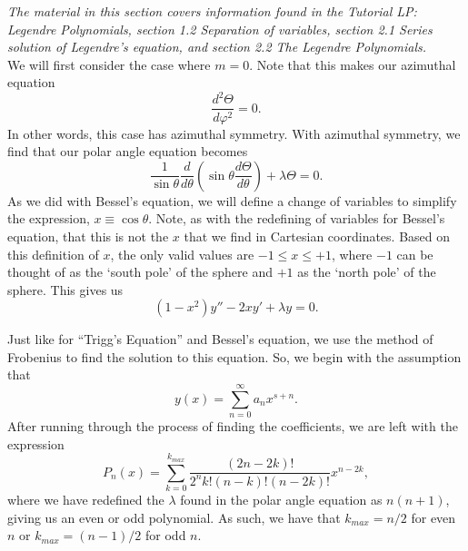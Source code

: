 \documentclass[11pt]{report}
\newcommand{\fpar}[1]{\left({#1}\right)}
\begin{document}
\emph{The material in this section covers information found in the Tutorial LP: Legendre Polynomials, section 1.2 Separation of variables, section 2.1 Series solution of Legendre’s equation, and section 2.2 The Legendre Polynomials.}\\



We will first consider the case where $m=0$. Note that this makes our azimuthal equation
    \begin{equation*}
        \frac{d^2\Theta}{d\varphi^2} = 0.
    \end{equation*}
In other words, this case has azimuthal symmetry. With azimuthal symmetry, we find that our polar angle equation becomes
    \begin{equation}
        \frac{1}{\sin{\theta}}\frac{d}{d\theta}\left(\sin{\theta}\frac{d\Theta}{d\theta}\right) + \lambda\Theta = 0.
    \end{equation}
As we did with Bessel's equation, we will define a change of variables to simplify the expression, $x\equiv\cos{\theta}$. Note, as with the redefining of variables for Bessel's equation, that this is not the $x$ that we find in Cartesian coordinates. Based on this definition of $x$, the only valid values are $-1\leq x\leq+1$, where $-1$ can be thought of as the `south pole' of the sphere and $+1$ as the `north pole' of the sphere. This gives us
    \begin{equation}
        \left(1-x^2\right)y'' - 2xy' + \lambda y = 0.
    \end{equation}

Just like for ``Trigg's Equation'' and Bessel's equation, we use the method of Frobenius to find the solution to this equation. So, we begin with the assumption that
    \begin{equation*}
        y(x) = \sum_{n=0}^\infty a_nx^{s+n}.
    \end{equation*}
After running through the process of finding the coefficients, we are left with the expression
    \begin{equation}
        P_n\fpar{x} = \sum_{k=0}^{k_{max}}\frac{\fpar{2n-2k}!}{2^nk!\fpar{n-k}!\fpar{n-2k}!}x^{n-2k},
    \end{equation}
where we have redefined the $\lambda$ found in the polar angle equation as $n(n+1)$, giving us an even or odd polynomial. As such, we have that $k_{max} = n/2$ for even $n$ or $k_{max} = (n-1)/2$ for odd $n$.\\
\end{document}

